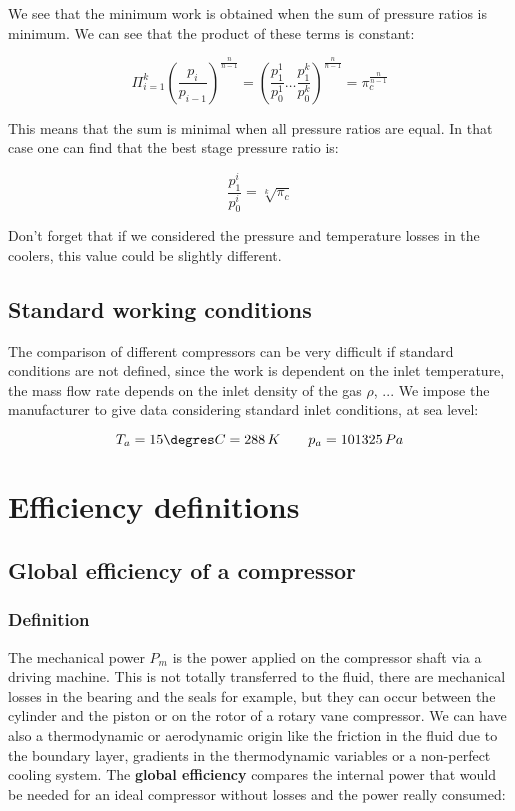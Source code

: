 We see that the minimum work is obtained when the sum of pressure ratios is minimum. We can see that the product of these terms is constant: 

\begin{equation}
\Pi _{i=1}^k \left(\frac{p_i}{p_{i-1}} \right)^{\frac{n}{n-1}} = \left(\frac{p_1^1}{p_0^1} \dots \frac{p_1^k}{p_0^k} \right)^{\frac{n}{n-1}} = \pi _c^{\frac{n}{n-1}}
\end{equation}

This means that the sum is minimal when all pressure ratios are equal. In that case one can find that the best stage pressure ratio is: 

\begin{equation}
\frac{p_1^i}{p_0^i} = \sqrt[k]{\pi _c}
\end{equation} 

Don't forget that if we considered the pressure and temperature losses in the coolers, this value could be slightly different. 

\subsection{Standard working conditions}
The comparison of different compressors can be very difficult if standard conditions are not defined, since the work is dependent on the inlet temperature, the mass flow rate depends on the inlet density of the gas $\rho$, ... We impose the manufacturer to give data considering standard inlet conditions, at sea level: 

\begin{equation}
T_a = 15\degres C = 288 \, K \qquad p_a = 101325\, Pa
\end{equation}

\section{Efficiency definitions}
\subsection{Global efficiency of a compressor}
\subsubsection{Definition}
The mechanical power $P_m$ is the power applied on the compressor shaft via a driving machine. This is not totally transferred to the fluid, there are mechanical losses in the bearing and the seals for example, but they can occur between the cylinder and the piston or on the rotor of a rotary vane compressor. We can have also a thermodynamic or aerodynamic origin like the friction in the fluid due to the boundary layer, gradients in the thermodynamic variables or a non-perfect cooling system. The \textbf{global efficiency} compares the internal power that would be needed for an ideal compressor without losses and the power really consumed: 

